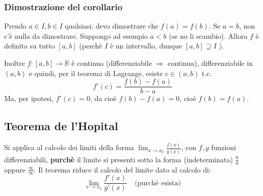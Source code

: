 \documentclass[a4paper]{article}
\theoremstyle{break}
\theoremstyle{break}
\theoremstyle{break}
\theoremstyle{break}
\begin{document}
\subsubsection{Dimostrazione del corollario}
Prendo \( a \in I, b \in I \) qualsiasi; devo dimostrare che \( f(a) = f(b) \).
Se \( a = b \), non c'è nulla da dimostrare. Suppongo ad esempio \( a < b \) (se no li scambio).
Allora \( f \) è definita su tutto \( [a,b] \) (perchè \( I \) è un intervallo, dunque \( [a,b] \supseteq I\) ).
\begin{figure}[H]
  \begin{center}
  \end{center}
\end{figure}
Inoltre \( f:[a,b] \to \mathbb{R} \) è continua (differenziabile \( \Rightarrow \) continua),
differenziabile in \( (a,b) \) e quindi, per il teorema di Lagrange, esiste \( c \in (a,b) \) t.c.
\[
  f'(c)=\frac{f(b)-f(a)}{b-a}
\] 
Ma, per ipotesi, \( f'(c)=0 \), da cioè \( f(b)-f(a)=0 \), cioè \( f(b)=f(a) \).

\subsection{Teorema de l'Hopital}
Si applica al calcolo dei limiti della forma \( \lim_{x \to x_0} \frac{f(x)}{g(x)} \), con \( f,g \) 
funzioni differenziabili, \textbf{purchè} il limite si presenti sotto la forma (indeterminata)
\( \frac{0}{0} \) oppure \( \frac{\infty}{\infty} \). Il teorema riduce il calcolo del limite
dato al calcolo di:
\[
  \lim_{x \to x_0} \frac{f'(x)}{g'(x)} \;\;\;\; \text{(purchè esista)}
\] 
\end{document}
